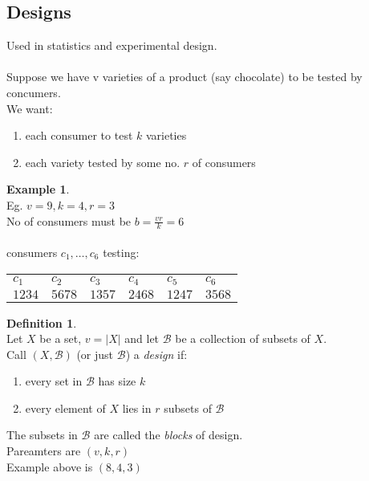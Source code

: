 \documentclass[]{article}
\theoremstyle{definition}
\newtheorem*{defn}{Definition}
\newtheorem*{exmp}{Example}
\theoremstyle{remark}
\numberwithin{equation}{section}
\begin{document}
\subsection{Designs}
	Used in statistics and experimental design.\\
	\\
	Suppose we have v varieties of a product (say chocolate) to be tested by concumers.\\
	We want:\\
	\begin{enumerate}
		\item each consumer to test $k$ varieties
		\item each variety tested by some no. $r$ of consumers
	\end{enumerate}

	\begin{exmp}\hfill\\
		Eg. $v =9, k = 4, r =3$\\
		No of consumers must be $b = \frac{vr}{k} = 6$\\
		\\
		consumers $c_1, …, c_6$ testing:\\
		\begin{table}[h]
			\begin{tabular}{llllll}
			$c_1$  & $c_2$  & $c_3$  & $c_4$  & $c_5$  & $c_6$ \\
			$1234$ & $5678$ & $1357$ & $2468$ & $1247$ & $3568$ \\
			\end{tabular}
		\end{table}
	\end{exmp}
	\begin{defn}\hfill\\
	Let $X$ be a set, $v = |X|$ and let $\mathscr{B}$ be a collection of subsets of $X$.\\
	Call $(X, \mathscr{B})$ (or just $\mathscr{B}$) a \emph{design} if:\\
	\begin{enumerate}
		\item every set in $\mathscr{B}$ has size $k$
		\item every element of $X$ lies in $r$ subsets of $\mathscr{B}$
	\end{enumerate}
	\end{defn}
	The subsets in $\mathscr{B}$ are called the \emph{blocks} of design.\\
	Pareamters are $(v,k,r)$\\
	Example above is $(8,4,3)$\\
\end{document}
